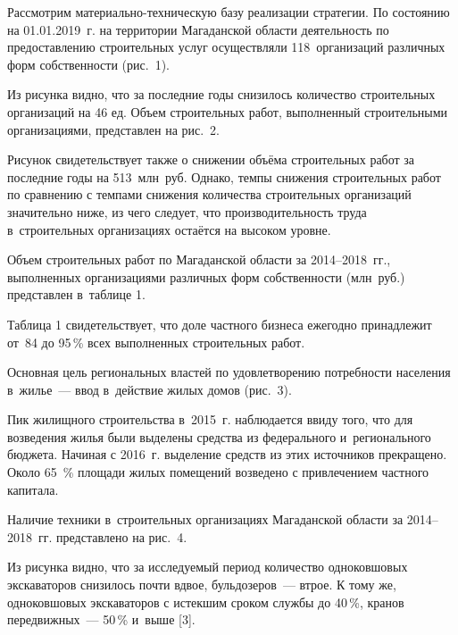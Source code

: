 Рассмотрим материально-техническую базу реализации стратегии. По состоянию на 01.01.2019~г. на территории Магаданской области деятельность по предоставлению строительных услуг осуществляли 118~организаций различных форм собственности (рис.~1).



Из рисунка видно, что за последние годы снизилось количество строительных организаций на 46 ед. Объем строительных работ, выполненный строительными организациями, представлен на рис.~2.



Рисунок свидетельствует также о снижении объёма строительных работ за последние годы на 513~млн~руб. Однако, темпы снижения строительных работ по сравнению с темпами снижения количества строительных организаций значительно ниже, из чего следует, что производительность труда в~строительных организациях остаётся на высоком уровне.

Объем строительных работ по Магаданской области за 2014--2018~гг., выполненных организациями различных форм собственности (млн~руб.) представлен в~таблице 1.



Таблица 1 свидетельствует, что доле частного бизнеса ежегодно принадлежит от~84 до 95\,\% всех выполненных строительных работ.

Основная цель региональных властей по удовлетворению потребности населения в~жилье~--- ввод в~действие жилых домов (рис.~3).


\vspace{-8pt}
Пик жилищного строительства в~2015~г. наблюдается ввиду того, что для возведения жилья были выделены средства из федерального и~регионального бюджета. Начиная с 2016~г. выделение средств из этих источников прекращено. Около 65 \,\%  площади жилых помещений возведено с привлечением частного капитала.

Наличие техники в~строительных организациях Магаданской области за 2014--2018~гг. представлено на рис.~4.



Из рисунка видно, что за исследуемый период количество одноковшовых экскаваторов снизилось почти вдвое, бульдозеров~--- втрое. К тому же, одноковшовых экскаваторов с истекшим сроком службы до 40\,\%, кранов передвижных~--- 50\,\% и~выше [3].


